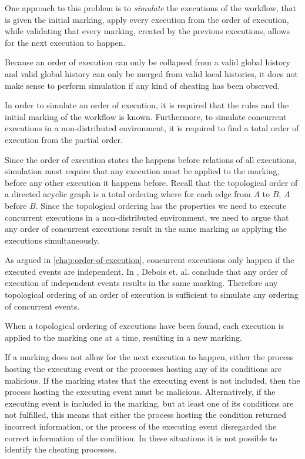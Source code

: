     \newpar One approach to this problem is to \textit{simulate} the executions of the workflow, that is given the initial marking, apply every execution from the order of execution, while validating that every marking, created by the previous executions, allows for the next execution to happen.
    
    \newpar Because an order of execution can only be collapsed from a valid global history and valid global history can only be merged from valid local histories, it does not make sense to perform simulation if any kind of cheating has been observed.
    
    \newpar In order to simulate an order of execution, it is required that the rules and the initial marking of the workflow is known. Furthermore, to simulate concurrent executions in a non-distributed environment, it is required to find a total order of execution from the partial order.
    
    \newpar
	Since the order of execution states the happens before relations of all executions, simulation must require that any execution must be applied to the marking, before any other execution it happens before. Recall that the topological order of a directed acyclic graph is a total ordering where for each edge from $A$ to $B$, $A$ before $B$. Since the topological ordering has the properties we need to execute concurrent executions in a non-distributed environment, we need to argue that any order of concurrent executions result in the same marking as applying the executions simultaneously.
	
	As argued in \autoref{chap:order-of-execution}, concurrent executions only happen if the executed events are independent. In \cite{debois2015concurrency}, Debois et. al. conclude that any order of execution of independent events results in the same marking. Therefore any topological ordering of an order of execution is sufficient to simulate any ordering of concurrent events.
    
    When a topological ordering of executions have been found, each execution is applied to the marking one at a time, resulting in a new marking.
    
    \newpar If a marking does not allow for the next execution to happen, either the process hosting the executing event or the processes hosting any of its conditions are malicious. If the marking states that the executing event is not included, then the process hosting the executing event must be malicious. Alternatively, if the executing event is included in the marking, but at least one of its conditions are not fulfilled, this means that either the process hosting the condition returned incorrect information, or the process of the executing event disregarded the correct information of the condition. In these situations it is not possible to identify the cheating processes.

